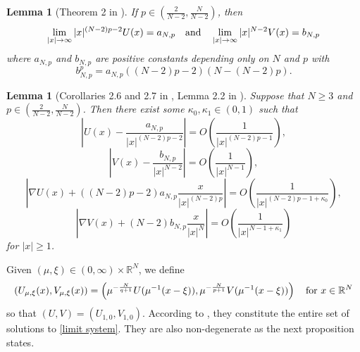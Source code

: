 \documentclass[reqno]{amsart}
\newtheorem{lemma}[theorem]{Lemma}
\theoremstyle{remark}
\newcommand{\R}{\mathbb{R}}
\newcommand{\mx}{{\mu,\xi}}
\renewcommand{\(}{\left(}
\renewcommand{\)}{\right)}
\numberwithin{equation}{section}
\begin{document}
\begin{lemma}[Theorem 2 in \cite{HV}]
If $p \in (\frac{2}{N-2},\frac{N}{N-2})$, then
$$
\lim_{|x| \to \infty} |x|^{(N-2)p-2}U(x) = a_{N,p} \quad \textup{and} \quad \lim_{|x| \to \infty} |x|^{N-2}V(x) = b_{N,p}
$$
where $a_{N,p}$ and $b_{N,p}$ are positive constants depending only on $N$ and $p$ with
\begin{equation}\label{bnp anp}
b_{N,p}^p = a_{N,p}\((N-2)p-2\)\(N-(N-2)p\).
\end{equation}
\end{lemma}

\begin{lemma}[Corollaries 2.6 and 2.7 in \cite{KP}, Lemma 2.2 in \cite{KM}]\label{limit decay}
Suppose that $N \ge 3$ and $p \in (\frac{2}{N-2},\frac{N}{N-2})$. Then there exist some $\kappa_0, \kappa_1 \in (0,1)$ such that
\begin{equation}\label{decay for u}
\left|U(x)-\frac{a_{N,p}}{|x|^{(N-2)p-2}}\right| = O\(\frac{1}{|x|^{(N-2)p-1}}\),
\end{equation}
\begin{equation}\label{decay for v}
\left|V(x)-\frac{b_{N,p}}{|x|^{N-2}}\right| = O\(\frac{1}{|x|^{N-1}}\),
\end{equation}
\begin{equation}\label{decay for grad u}
\left|\nabla U(x)+((N-2)p-2)a_{N,p}\frac{x}{|x|^{(N-2)p}}\right|= O\(\frac{1}{|x|^{(N-2)p-1 +\kappa_0}}\),
\end{equation}
\begin{equation}\label{decay for grad v}
\left|\nabla V(x)+(N-2)b_{N,p}\frac{x}{|x|^N}\right| = O\(\frac{1}{|x|^{N-1+\kappa_1}}\)
\end{equation}
for $|x| \ge 1$.
\end{lemma}

Given $(\mu,\xi) \in (0,\infty) \times \R^N$, we define
\begin{equation}\label{UVmx}
(U_\mx(x),V_\mx(x)) = \(\mu^{-\frac{N}{q+1}}U(\mu^{-1}(x-\xi)),\mu^{-\frac{N}{p+1}}V(\mu^{-1}(x-\xi))\) \quad \textup{for } x \in \R^N
\end{equation}
so that $(U,V) = (U_{1,0},V_{1,0})$. According to \cite{Wa, HV}, they constitute the entire set of solutions to \eqref{limit system}. They are also non-degenerate as the next proposition states.
\end{document}
